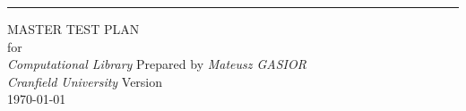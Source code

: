 	
\begin{titlepage}
	\begin{flushright}
		\rule{15cm}{5pt}\vskip1cm
		\begin{bfseries}
			\Huge{MASTER TEST PLAN}\\
			\vspace{2cm}
			\Large{for}\\
			\vspace{1.5cm}
			\LARGE{
				\textit{Computational Library}
			}
			\vfill
			Prepared by \textit{Mateusz GASIOR}\\
			\vspace{2cm}
			\Large{
				\textit{Cranfield University}
			}
			\vfill
			\Large{Version \myversion}\\
			\vfill
			{\large \today}
		\end{bfseries}
	\end{flushright}
\end{titlepage}